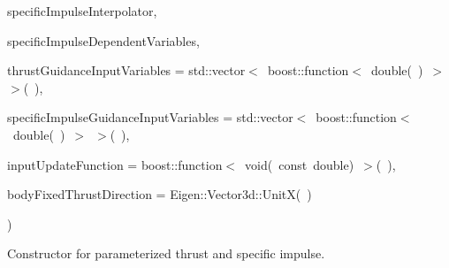 {\begin{DoxyParamCaption}
\item[{const boost\+::shared\+\_\+ptr$<$ {\bf interpolators\+::\+Interpolator}$<$ double, double $>$ $>$}]{specific\+Impulse\+Interpolator, }
\item[{const std\+::vector$<$ propulsion\+::\+Thrust\+Independent\+Variables $>$}]{specific\+Impulse\+Dependent\+Variables, }
\item[{const std\+::vector$<$ boost\+::function$<$ double() $>$ $>$}]{thrust\+Guidance\+Input\+Variables = {\ttfamily std\+:\+:vector$<$~boost\+:\+:function$<$~double(~)~$>$~$>$(~)}, }
\item[{const std\+::vector$<$ boost\+::function$<$ double() $>$ $>$}]{specific\+Impulse\+Guidance\+Input\+Variables = {\ttfamily std\+:\+:vector$<$~boost\+:\+:function$<$~double(~)~$>$~$>$(~)}, }
\item[{const boost\+::function$<$ void(const double) $>$}]{input\+Update\+Function = {\ttfamily boost\+:\+:function$<$~void(~const~double)~$>$(~)}, }
\item[{const Eigen\+::\+Vector3d}]{body\+Fixed\+Thrust\+Direction = {\ttfamily Eigen\+:\+:Vector3d\+:\+:UnitX(~)}}
\end{DoxyParamCaption}
)\hspace{0.3cm}{\ttfamily [inline]}}\hypertarget{classtudat_1_1simulation__setup_1_1ParameterizedThrustMagnitudeSettings_a35cf9d1771df030daf0d4eb11f3f7086}{}\label{classtudat_1_1simulation__setup_1_1ParameterizedThrustMagnitudeSettings_a35cf9d1771df030daf0d4eb11f3f7086}


Constructor for parameterized thrust and specific impulse. 

